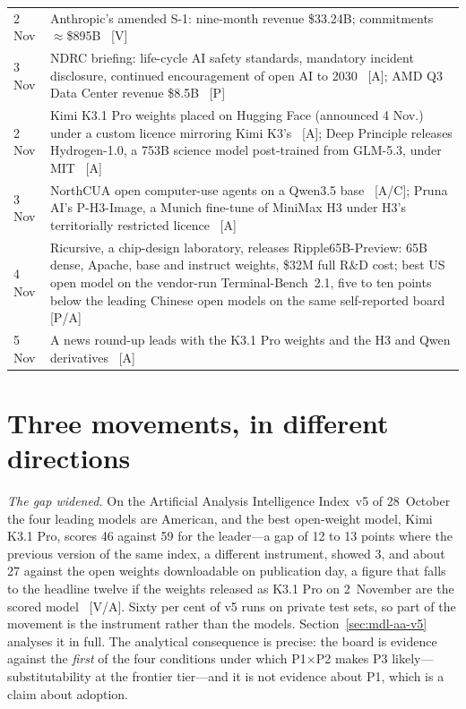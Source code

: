 \begin{small}
\begin{longtable}{p{20mm}p{122mm}}
  2 Nov & Anthropic's amended S-1: nine-month revenue \$33.24B; commitments $\approx$\$895B~\cite{cap-anthropic-s1} [V] \\
  3 Nov & NDRC briefing: life-cycle AI safety standards, mandatory incident disclosure, continued encouragement of open AI to 2030~\cite{gov-ndrc-briefing} [A]; AMD Q3 Data Center revenue \$8.5B~\cite{hw-amd-q3} [P] \\
  2 Nov & Kimi K3.1 Pro weights placed on Hugging Face (announced 4 Nov.) under a custom licence mirroring Kimi K3's~\cite{lit-k31-weights} [A]; Deep Principle releases Hydrogen-1.0, a 753B science model post-trained from GLM-5.3, under MIT~\cite{lit-hydrogen} [A] \\
  3 Nov & NorthCUA open computer-use agents on a Qwen3.5 base~\cite{lit-northcua} [A/C]; Pruna AI's P-H3-Image, a Munich fine-tune of MiniMax H3 under H3's territorially restricted licence~\cite{lit-pruna} [A] \\
  4 Nov & Ricursive, a chip-design laboratory, releases Ripple65B-Preview: 65B dense, Apache, base and instruct weights, \$32M full R\&D cost; best US open model on the vendor-run Terminal-Bench~2.1, five to ten points below the leading Chinese open models on the same self-reported board~\cite{lit-ripple,lit-witteveen-ripple} [P/A] \\
  5 Nov & A news round-up leads with the K3.1 Pro weights and the H3 and Qwen derivatives~\cite{lit-berman-nov} [A] \\
\end{longtable}
\end{small}

\section{Three movements, in different directions}

\emph{The gap widened.} On the Artificial Analysis Intelligence Index~v5 of 28~October the four leading models are American, and the best open-weight model, Kimi K3.1 Pro, scores 46 against 59 for the leader---a gap of 12 to 13 points where the previous version of the same index, a different instrument, showed 3, and about 27 against the open weights downloadable on publication day, a figure that falls to the headline twelve if the weights released as K3.1 Pro on 2~November are the scored model~\cite{mdl-aa-v5,lit-k31-weights} [V/A]. Sixty per cent of v5 runs on private test sets, so part of the movement is the instrument rather than the models. Section~\ref{sec:mdl-aa-v5} analyses it in full. The analytical consequence is precise: the board is evidence against the \emph{first} of the four conditions under which P1$\times$P2 makes P3 likely---substitutability at the frontier tier---and it is not evidence about P1, which is a claim about adoption.

